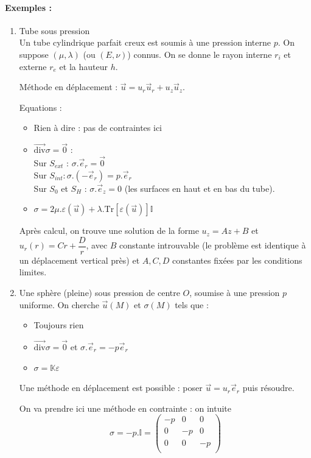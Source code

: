 \documentclass{article}
\begin{document}
\paragraph{Exemples :}
\begin{enumerate}
\item Tube sous pression\\
Un tube cylindrique parfait creux est soumis à une pression interne $p$. On suppose $(\mu,\lambda)$ (ou $(E,\nu)$) connus. On se donne le rayon interne $r_i$ et externe $r_e$ et la hauteur $h$.

Méthode en déplacement : $\vec{u} = u_r \vec{u}_r + u_z \vec{u}_z$.

Equations :
\begin{itemize}[label=$\star$]
\item Rien à dire : pas de contraintes ici
\item $\overrightarrow{\text{div}} \sigma = \vec{0}$ :\\
Sur $S_{ext}$ : $\sigma.\vec{e}_r=\vec{0}$\\
Sur $S_{int}:\sigma.(-\vec{e}_r)=p.\vec{e}_r$\\
Sur $S_0$ et $S_H$ : $\sigma.\vec{e}_z=0$ (les surfaces en haut et en bas du tube).
\item $\sigma = 2\mu.\varepsilon(\vec{u})+\lambda.\text{Tr}[\varepsilon(\vec{u})]\mathbb{I}$
\end{itemize}

Après calcul, on trouve une solution de la forme $u_z = Az+B$ et $u_r(r) = Cr + \dfrac{D}{r}$, avec $B$ constante introuvable (le problème est identique à un déplacement vertical près) et $A,C,D$ constantes fixées par les conditions limites.

\item Une sphère (pleine) sous pression de centre $O$, soumise à une pression $p$ uniforme. On cherche $\vec{u}(M)$ et $\sigma(M)$ tels que :
\begin{itemize}[label=$\star$]
\item Toujours rien
\item $\overrightarrow{\text{div}} \sigma = \vec{0}$ et $\sigma . \vec{e}_r = -p \vec{e}_r$
\item $\sigma = \mathbb{K} \varepsilon$
\end{itemize}

Une méthode en déplacement est possible : poser $\vec{u} = u_r \vec{e}_r$ puis résoudre.

On va prendre ici une méthode en contrainte : on intuite
\[
\sigma = -p.\mathbb{I} =
\begin{pmatrix}
-p & 0 & 0\\
0 & -p & 0\\
0 & 0 & -p\\
\end{pmatrix}
\]


\end{enumerate}
\end{document}
